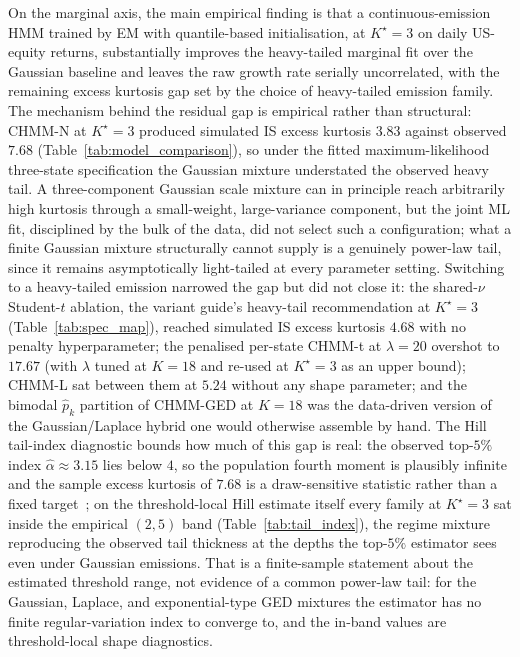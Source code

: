 On the marginal axis, the main empirical finding is that a continuous-emission HMM trained by EM with quantile-based initialisation, at $K^\star = 3$ on daily US-equity returns, substantially improves the heavy-tailed marginal fit over the Gaussian baseline and leaves the raw growth rate serially uncorrelated, with the remaining excess kurtosis gap set by the choice of heavy-tailed emission family. The mechanism behind the residual gap is empirical rather than structural: CHMM-N at $K^\star = 3$ produced simulated IS excess kurtosis $3.83$ against observed $7.68$ (Table~\ref{tab:model_comparison}), so under the fitted maximum-likelihood three-state specification the Gaussian mixture understated the observed heavy tail. A three-component Gaussian scale mixture can in principle reach arbitrarily high kurtosis through a small-weight, large-variance component, but the joint ML fit, disciplined by the bulk of the data, did not select such a configuration; what a finite Gaussian mixture structurally cannot supply is a genuinely power-law tail, since it remains asymptotically light-tailed at every parameter setting. Switching to a heavy-tailed emission narrowed the gap but did not close it: the shared-$\nu$ Student-$t$ ablation, the variant guide's heavy-tail recommendation at $K^\star = 3$ (Table~\ref{tab:spec_map}), reached simulated IS excess kurtosis $4.68$ with no penalty hyperparameter; the penalised per-state CHMM-t at $\lambda = 20$ overshot to $17.67$ (with $\lambda$ tuned at $K = 18$ and re-used at $K^\star = 3$ as an upper bound); CHMM-L sat between them at $5.24$ without any shape parameter; and the bimodal $\hat p_k$ partition of CHMM-GED at $K = 18$ was the data-driven version of the Gaussian/Laplace hybrid one would otherwise assemble by hand. The Hill tail-index diagnostic bounds how much of this gap is real: the observed top-$5\%$ index $\hat\alpha \approx 3.15$ lies below $4$, so the population fourth moment is plausibly infinite and the sample excess kurtosis of $7.68$ is a draw-sensitive statistic rather than a fixed target~\cite{cont2001empirical}; on the threshold-local Hill estimate itself every family at $K^\star = 3$ sat inside the empirical $(2, 5)$ band (Table~\ref{tab:tail_index}), the regime mixture reproducing the observed tail thickness at the depths the top-$5\%$ estimator sees even under Gaussian emissions. That is a finite-sample statement about the estimated threshold range, not evidence of a common power-law tail: for the Gaussian, Laplace, and exponential-type GED mixtures the estimator has no finite regular-variation index to converge to, and the in-band values are threshold-local shape diagnostics.

